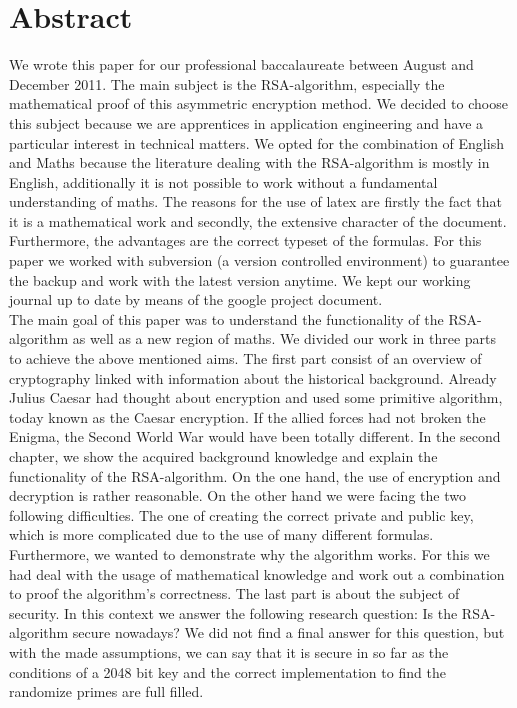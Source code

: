 \section{Abstract}
We wrote this paper for our professional baccalaureate between August and December 2011. The main subject is the RSA-algorithm, especially the mathematical proof of this asymmetric encryption method. We decided to choose this subject because we are apprentices in application engineering and have a particular interest in technical matters. We opted for the combination of English and Maths because the literature dealing with the RSA-algorithm is mostly in English, additionally it is not possible to work without a fundamental understanding of maths. The reasons for the use of latex are firstly the fact that it is a mathematical work and secondly, the extensive character of the document. Furthermore, the advantages are the correct typeset of the formulas. For this paper we worked with subversion (a version controlled environment) to guarantee the backup and work with the latest version anytime. We kept our working journal up to date by means of the google project document. \\
The main goal of this paper was to understand the functionality of the RSA-algorithm as well as a new region of maths. We divided our work in three parts to achieve the above mentioned aims. The first part consist of an overview of cryptography linked with information about the historical background. Already Julius Caesar had thought about encryption and used some primitive algorithm, today known as the Caesar encryption. If the allied forces had not broken the Enigma, the Second World War would have been totally different. %
In the second chapter, we show the acquired background knowledge and explain the functionality of the RSA-algorithm. 
On the one hand, the use of encryption and decryption is rather reasonable. On the other hand we were facing the two following difficulties. The one of creating the correct private and public key, which is more complicated due to the use of many different formulas. Furthermore, we wanted to demonstrate why the algorithm works. For this we had deal with the usage of mathematical knowledge and work out a combination to proof the algorithm's correctness. 
The last part is about the subject of security. In this context we answer the following research question: Is the RSA-algorithm secure nowadays? We did not find a final answer for this question, but with the made assumptions, %
we can say that it is secure in so far as the conditions of a 2048 bit key and the correct implementation to find the randomize primes are full filled. \\
